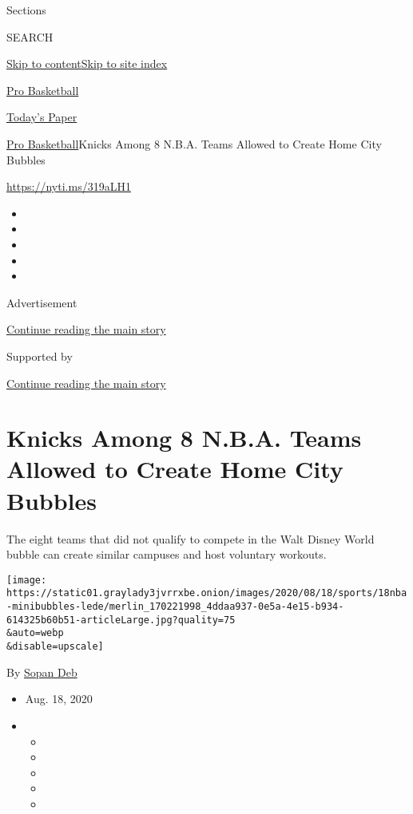 Sections

SEARCH

\protect\hyperlink{site-content}{Skip to
content}\protect\hyperlink{site-index}{Skip to site index}

\href{https://www.nytimes3xbfgragh.onion/section/sports/basketball}{Pro
Basketball}

\href{https://myaccount.nytimes3xbfgragh.onion/auth/login?response_type=cookie\&client_id=vi}{}

\href{https://www.nytimes3xbfgragh.onion/section/todayspaper}{Today's
Paper}

\href{/section/sports/basketball}{Pro Basketball}\textbar{}Knicks Among
8 N.B.A. Teams Allowed to Create Home City Bubbles

\url{https://nyti.ms/319aLH1}

\begin{itemize}
\item
\item
\item
\item
\item
\end{itemize}

Advertisement

\protect\hyperlink{after-top}{Continue reading the main story}

Supported by

\protect\hyperlink{after-sponsor}{Continue reading the main story}

\hypertarget{knicks-among-8-nba-teams-allowed-to-create-home-city-bubbles}{%
\section{Knicks Among 8 N.B.A. Teams Allowed to Create Home City
Bubbles}\label{knicks-among-8-nba-teams-allowed-to-create-home-city-bubbles}}

The eight teams that did not qualify to compete in the Walt Disney World
bubble can create similar campuses and host voluntary workouts.

\texttt{[image: https://static01.graylady3jvrrxbe.onion/images/2020/08/18/sports/18nba-minibubbles-lede/merlin\_170221998\_4ddaa937-0e5a-4e15-b934-614325b60b51-articleLarge.jpg?quality=75\\\&auto=webp\\\&disable=upscale]}

By \href{https://www.nytimes3xbfgragh.onion/by/sopan-deb}{Sopan Deb}

\begin{itemize}
\item
  Aug. 18, 2020
\item
  \begin{itemize}
  \item
  \item
  \item
  \item
  \item
  \end{itemize}
\end{itemize}

